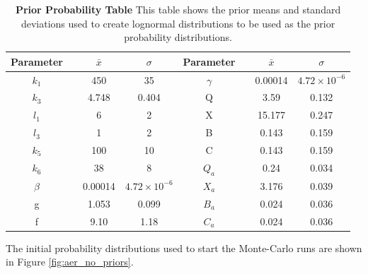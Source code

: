 \begin{table}[ht]%
\renewcommand{\arraystretch}{1.5}
\begin{center}
\begin{tabular}{cccc|cccc}
\toprule
\textbf{Parameter} && ${\bar{x}}$ & $\sigma$ & \textbf{Parameter} && ${\bar{x}}$ & $\sigma$\\
\midrule
$k_1$ && 450 & 35 & $\gamma$ && 0.00014 & $4.72\times 10^{-6}$\\
$k_3$ && 4.748 & 0.404 & Q && 3.59 & 0.132\\
$l_1$ && 6 & 2 & X && 15.177 & 0.247\\
$l_3$ && 1 & 2 & B && 0.143 & 0.159\\
$k_5$ && 100 & 10 & C && 0.143 & 0.159\\
$k_6$ && 38 & 8 & $Q_a$ && 0.24 & 0.034\\
$\beta$ && 0.00014 & $4.72\times 10^{-6}$ & $X_a$ && 3.176 & 0.039\\
g && 1.053 & 0.099 & $B_a$ && 0.024 & 0.036\\
f && 9.10 & 1.18 & $C_a$ && 0.024 & 0.036\\
\bottomrule
\end{tabular}
\end{center}
\caption[Prior Probability Table]{{\bf Prior Probability Table} This table shows the prior means and standard deviations used to create lognormal distributions to be used as the prior probability distributions.
\label{tab:noProbstat1}}
\end{table}
\afterpage{\clearpage}
The initial probability distributions used to start the Monte-Carlo runs are shown in Figure \ref{fig:aer_no_priors}.
